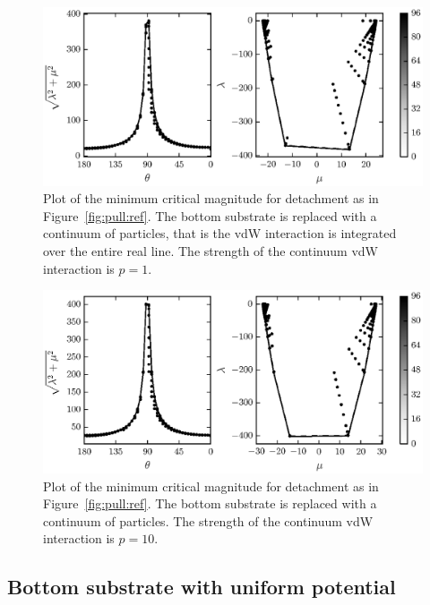 	\begin{figure}
		\begin{center}
			\includegraphics{./fig/ch3/pull/p1/grid.eps}
		\end{center}		
		\caption{Plot of the minimum critical magnitude for detachment as in Figure~\ref{fig:pull:ref}. The bottom substrate is replaced with a continuum of particles, that is the vdW interaction is integrated over the entire real line. The strength of the continuum vdW interaction is $p=1$.
		\label{fig:pull:p1}}
	\end{figure}
	
	\begin{figure}
		\begin{center}
			\includegraphics{./fig/ch3/pull/p10/grid.eps}
		\end{center}		
		\caption{Plot of the minimum critical magnitude for detachment as in Figure~\ref{fig:pull:ref}. The bottom substrate is replaced with a continuum of particles. The strength of the continuum vdW interaction is $p=10$.
		\label{fig:pull:p10}}
	\end{figure}

\subsection{Bottom substrate with uniform potential} \label{section:detachment:pressure}


